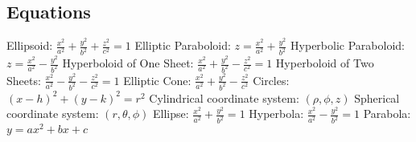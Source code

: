 \documentclass[12pt]{article}
\begin{document}
\begin{paracol}{2}
        \subsection*{Equations}
        \begin{fleqn}
            Ellipsoid: $\frac{x^2}{a^2} + \frac{y^2}{b^2} + \frac{z^2}{c^2} = 1 $ \newline
            Elliptic Paraboloid: $z=\frac{x^2}{a^2}+\frac{y^2}{b^2}$ \newline
            Hyperbolic Paraboloid: $z=\frac{x^2}{a^2}-\frac{y^2}{b^2}$ \newline
            Hyperboloid of One Sheet: $\frac{x^2}{a^2} + \frac{y^2}{b^2} - \frac{z^2}{c^2} = 1 $ \newline
            Hyperboloid of Two Sheets: $\frac{x^2}{a^2} - \frac{y^2}{b^2} - \frac{z^2}{c^2} = 1 $ \newline
            Elliptic Cone: $\frac{x^2}{a^2}+\frac{y^2}{b^2}-\frac{z^2}{c^2}$ \newline
            Circles: $(x-h)^2 + (y-k)^2 = r^2$ \newline
            Cylindrical coordinate system: $(\rho,\phi,z)$ \newline
            Spherical coordinate system: $(r,\theta,\phi)$ \newline
            Ellipse: $\frac{x^2}{a^2}+\frac{y^2}{b^2}=1$ \newline
            Hyperbola: $\frac{x^2}{a^2}-\frac{y^2}{b^2}=1$ \newline
            Parabola: $y=ax^2+bx+c$
        \end{fleqn}

\end{paracol}
\end{document}
